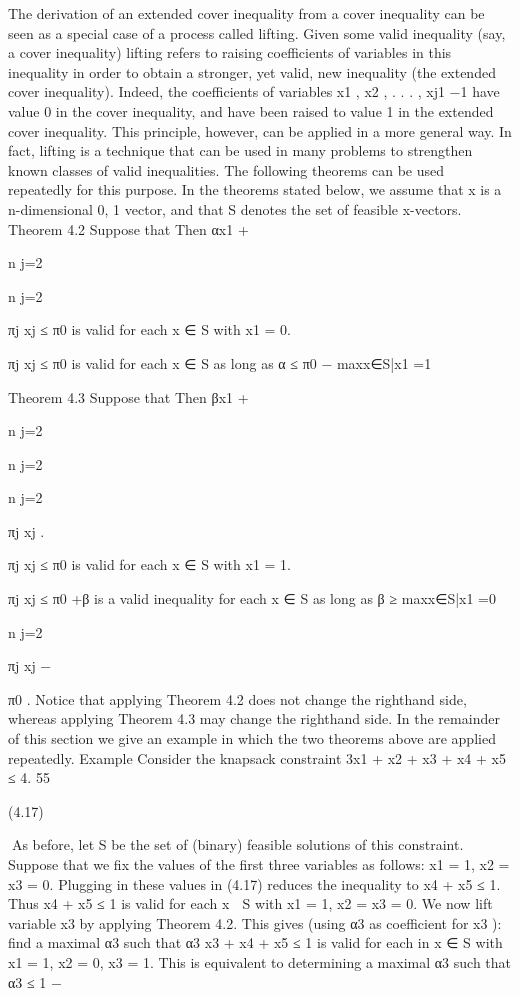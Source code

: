 The derivation of an extended cover inequality from a cover inequality can be seen as a special case
of a process called lifting. Given some valid inequality (say, a cover inequality) lifting refers to raising
coefficients of variables in this inequality in order to obtain a stronger, yet valid, new inequality (the
extended cover inequality). Indeed, the coefficients of variables x1 , x2 , . . . , xj1 −1 have value 0 in the cover
inequality, and have been raised to value 1 in the extended cover inequality. This principle, however, can
be applied in a more general way. In fact, lifting is a technique that can be used in many problems to
strengthen known classes of valid inequalities. The following theorems can be used repeatedly for this
purpose. In the theorems stated below, we assume that x is a n-dimensional {0, 1} vector, and that S
denotes the set of feasible x-vectors.
Theorem 4.2 Suppose that
Then αx1 +

n
j=2

n
j=2

πj xj ≤ π0 is valid for each x ∈ S with x1 = 0.

πj xj ≤ π0 is valid for each x ∈ S as long as α ≤ π0 − maxx∈S|x1 =1

Theorem 4.3 Suppose that
Then βx1 +

n
j=2

n
j=2

n
j=2

πj xj .

πj xj ≤ π0 is valid for each x ∈ S with x1 = 1.

πj xj ≤ π0 +β is a valid inequality for each x ∈ S as long as β ≥ maxx∈S|x1 =0

n
j=2

πj xj −

π0 .
Notice that applying Theorem 4.2 does not change the righthand side, whereas applying Theorem 4.3
may change the righthand side. In the remainder of this section we give an example in which the two
theorems above are applied repeatedly.
Example Consider the knapsack constraint
3x1 + x2 + x3 + x4 + x5 ≤ 4.
55

(4.17)

As before, let S be the set of (binary) feasible solutions of this constraint. Suppose that we fix the values
of the first three variables as follows:
x1 = 1, x2 = x3 = 0.
Plugging in these values in (4.17) reduces the inequality to x4 + x5 ≤ 1. Thus x4 + x5 ≤ 1 is valid for
each x ∈ S with x1 = 1, x2 = x3 = 0.
We now lift variable x3 by applying Theorem 4.2. This gives (using α3 as coefficient for x3 ): find a
maximal α3 such that α3 x3 + x4 + x5 ≤ 1 is valid for each in x ∈ S with x1 = 1, x2 = 0, x3 = 1. This is
equivalent to determining a maximal α3 such that
α3 ≤ 1 −

